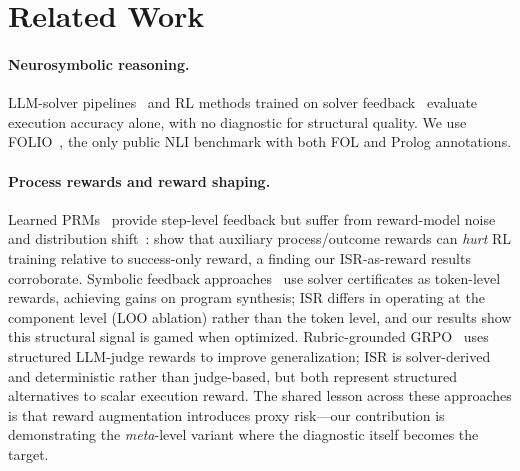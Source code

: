 \section{Related Work}
\label{sec:related-work}

\paragraph{Neurosymbolic reasoning.}
LLM-solver pipelines~\citep{satlm, logic-lm, linc, fover-pei2025, lorp} and RL methods trained on solver feedback~\citep{mellgren-prolog-grpo, logic-rl, deepseek-prover-v15} evaluate execution accuracy alone, with no diagnostic for structural quality.
We use FOLIO~\citep{folio}, the only public NLI benchmark with both FOL and Prolog annotations.

\paragraph{Process rewards and reward shaping.}
Learned PRMs~\citep{lightman-verify-step, math-shepherd} provide step-level feedback but suffer from reward-model noise and distribution shift~\citep{processbench}: \citet{gao-effective-rl-reward} show that auxiliary process/outcome rewards can \emph{hurt} RL training relative to success-only reward, a finding our ISR-as-reward results corroborate.
Symbolic feedback approaches~\citep{rlsf} use solver certificates as token-level rewards, achieving gains on program synthesis; ISR differs in operating at the component level (LOO ablation) rather than the token level, and our results show this structural signal is gamed when optimized.
Rubric-grounded GRPO~\citep{rubric-grpo} uses structured LLM-judge rewards to improve generalization; ISR is solver-derived and deterministic rather than judge-based, but both represent structured alternatives to scalar execution reward.
The shared lesson across these approaches is that reward augmentation introduces proxy risk---our contribution is demonstrating the \emph{meta}-level variant where the diagnostic itself becomes the target.

